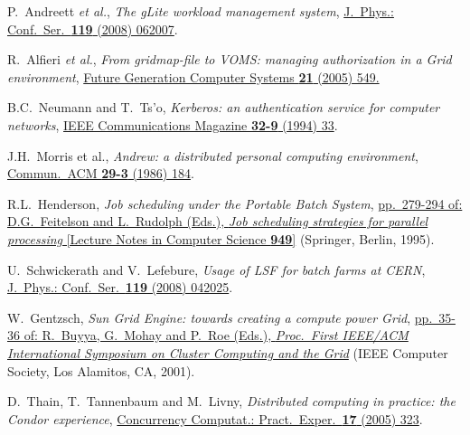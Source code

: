 \documentclass{elsart}
\def\etal {\textit{et al.}}
\begin{document}
\begin{thebibliography}{00}

 P.~Andreett \etal,
\textit{The gLite workload management system},
\href{http://dx.doi.org/10.1088/1742-6596/119/6/062007}
{J.~Phys.: Conf.\ Ser.\ \textbf{119} (2008) 062007}.

 R.~Alfieri \etal,
\textit{From gridmap-file to VOMS: managing authorization in a Grid
environment},
\href{http://dx.doi.org/10.1016/j.future.2004.10.006}
{Future Generation Computer Systems \textbf{21} (2005) 549.}

 B.C.~Neumann and T.~Ts'o,
\textit{Kerberos: an authentication service for computer networks},
\href{http://dx.doi.org/10.1109/35.312841}
{IEEE Communications Magazine \textbf{32-9} (1994) 33}.

 J.H.~Morris et al.,
\textit{Andrew: a distributed personal computing environment},
\href{http://dx.doi.org/10.1145/5666.5671}
{Commun.\ ACM \textbf{29-3} (1986) 184}.

%

 R.L.~Henderson,
\textit{Job scheduling under the Portable Batch System},
\href{http://dx.doi.org/10.1007/3-540-60153-8}
{pp.~279-294 of: D.G.~Feitelson and L.~Rudolph (Eds.),
\textit{Job scheduling strategies for parallel processing}
[Lecture Notes in Computer Science \textbf{949}]} (Springer, Berlin, 1995).

 U.~Schwickerath and V.~Lefebure,
\textit{Usage of LSF for batch farms at CERN},
\href{http://dx.doi.org/10.1088/1742-6596/119/4/042025}
{J.~Phys.: Conf.\ Ser.\ \textbf{119} (2008) 042025}.

 W.~Gentzsch,
\textit{Sun Grid Engine: towards creating a compute power Grid},
\href{http://dx.doi.org/10.1109/CCGRID.2001.923173}
{pp.~35-36 of: R.~Buyya, G.~Mohay and P.~Roe (Eds.),
\textit{Proc.\ First IEEE/ACM International Symposium on Cluster
Computing and the Grid}} (IEEE Computer Society, Los Alamitos, CA, 2001).

 D.~Thain, T.~Tannenbaum and M.~Livny,
\textit{Distributed computing in practice: the Condor experience},
\href{http://dx.doi.org/10.1002/cpe.938}
{Concurrency Computat.: Pract.\ Exper.\ \textbf{17} (2005) 323}.


\end{thebibliography}
\end{document}
